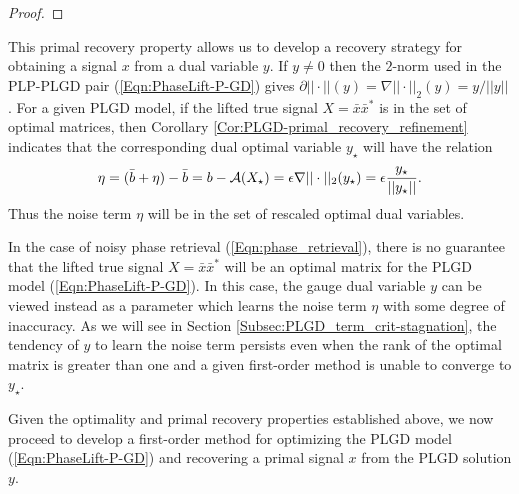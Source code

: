 \begin{enumerate}
\begin{proof}
\end{proof}

This primal recovery property allows us to develop a recovery strategy for obtaining a signal $x$ from a dual variable $y$.  If $y \neq 0$ then the $2$-norm used in the PLP-PLGD pair (\ref{Eqn:PhaseLift-P-GD}) gives $\partial ||\cdot||(y) = \nabla ||\cdot||_2(y) = y / ||y||$.  For a given PLGD model, if the lifted true signal $X = \bar{x}\bar{x}^*$ is in the set of optimal matrices, then  Corollary \ref{Cor:PLGD-primal_recovery_refinement} indicates that the corresponding dual optimal variable $y_\star$ will have the relation 
\begin{equation} 			\label{Eqn:PLGD-noise_is_dual_variable}
\eta = (\bar{b} + \eta) - \bar{b} = b - {\mathcal A}(X_\star)  = \epsilon \nabla ||\cdot||_2(y_\star) = \epsilon \frac{y_\star}{||y_\star||}.
\end{equation}
Thus the noise term $\eta$ will be in the set of rescaled optimal dual variables.  

In the case of noisy phase retrieval (\ref{Eqn:phase_retrieval}), there is no guarantee that the lifted true signal $X = \bar{x}\bar{x}^*$ will be an optimal matrix for the PLGD model (\ref{Eqn:PhaseLift-P-GD}).  In this case, the gauge dual variable $y$ can be viewed instead as a parameter which learns the noise term $\eta$ with some degree of inaccuracy.  As we will see in Section \ref{Subsec:PLGD_term_crit-stagnation}, the tendency of $y$ to learn the noise term persists even when the rank of the optimal matrix is greater than one and a given first-order method is unable to converge to $y_\star$.

\end{enumerate}


Given the optimality and primal recovery properties established above, we now proceed to develop a first-order method for optimizing the PLGD model (\ref{Eqn:PhaseLift-P-GD}) and recovering a primal signal $x$ from the PLGD solution $y$.




